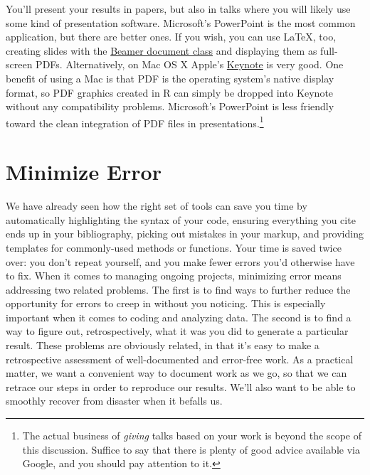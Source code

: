 \documentclass[11pt,article,oneside]{memoir}
\begin{document}
You'll present your results in papers, but also in talks where you
will likely use some kind of presentation software. Microsoft's
PowerPoint is the most common application, but there are better
ones. If you wish, you can use \LaTeX{}, too, creating slides with the
\href{http://latex-beamer.sourceforge.net/}{Beamer document class} and
displaying them as full-screen PDFs. Alternatively, on Mac OS X
Apple's \href{http://www.apple.com/iwork/keynote/}{Keynote} is very
good. One benefit of using a Mac is that PDF is the operating system's
native display format, so PDF graphics created in R can simply be
dropped into Keynote without any compatibility problems. Microsoft's
PowerPoint is less friendly toward the clean integration of PDF files
in presentations.\footnote{The actual business of \emph{giving} talks
  based on your work is beyond the scope of this discussion. Suffice
  to say that there is plenty of good advice available via Google, and
  you should pay attention to it. }
                          
\section*{Minimize Error}
\label{sec-6}

We have already seen how the right set of tools can save you time by
automatically highlighting the syntax of your code, ensuring
everything you cite ends up in your bibliography, picking out mistakes
in your markup, and providing templates for commonly-used methods or
functions. Your time is saved twice over: you don't repeat yourself,
and you make fewer errors you'd otherwise have to fix. When it comes
to managing ongoing projects, minimizing error means addressing two
related problems. The first is to find ways to further reduce the
opportunity for errors to creep in without you noticing. This is
especially important when it comes to coding and analyzing data. The
second is to find a way to figure out, retrospectively, what it was
you did to generate a particular result. These problems are obviously
related, in that it's easy to make a retrospective assessment of
well-documented and error-free work. As a practical matter, we want a
convenient way to document work as we go, so that we can retrace our
steps in order to reproduce our results. We'll also want to be able to
smoothly recover from disaster when it befalls us.
 
\end{document}
